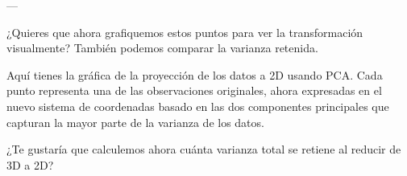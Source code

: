 \documentclass[12pt]{article} %
\begin{document}
---

¿Quieres que ahora grafiquemos estos puntos para ver la transformación visualmente? También podemos comparar la varianza retenida.

Aquí tienes la gráfica de la proyección de los datos a 2D usando PCA. Cada punto representa una de las observaciones originales, ahora expresadas en el nuevo sistema de coordenadas basado en las dos componentes principales que capturan la mayor parte de la varianza de los datos.

¿Te gustaría que calculemos ahora cuánta varianza total se retiene al reducir de 3D a 2D?
\end{document}
